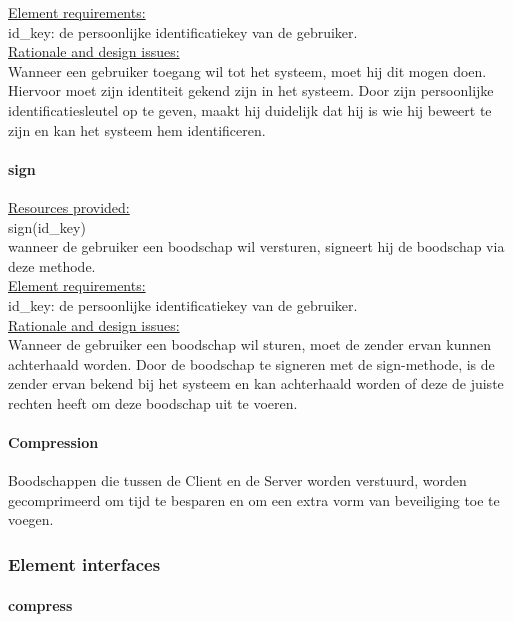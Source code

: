 \documentclass[a4paper,10pt]{article}
\begin{document}
\underline{Element requirements:}\\
id\_key: de persoonlijke identificatiekey van de gebruiker.\\

\underline{Rationale and design issues:}\\
Wanneer een gebruiker toegang wil tot het systeem, moet hij dit mogen doen. Hiervoor moet zijn identiteit gekend zijn in het systeem. Door zijn persoonlijke identificatiesleutel op te geven, maakt hij duidelijk dat hij is wie hij beweert te zijn en kan het systeem hem identificeren.\\

\paragraph{sign}

\underline{Resources provided:}\\
sign(id\_key)\\
wanneer de gebruiker een boodschap wil versturen, signeert hij de boodschap via deze methode.\\

\underline{Element requirements:}\\
id\_key: de persoonlijke identificatiekey van de gebruiker.\\

\underline{Rationale and design issues:}\\
Wanneer de gebruiker een boodschap wil sturen, moet de zender ervan kunnen achterhaald worden. Door de boodschap te signeren met de sign-methode, is de zender ervan bekend bij het systeem en kan achterhaald worden of deze de juiste rechten heeft om deze boodschap uit te voeren.\\

\paragraph{Compression}
Boodschappen die tussen de Client en de Server worden verstuurd, worden gecomprimeerd om tijd te besparen en om een extra vorm van beveiliging toe te voegen.

\subsubsection{Element interfaces}

\paragraph{compress}
\end{document}
